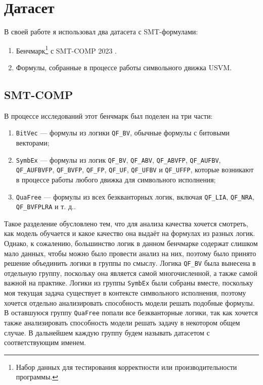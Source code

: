 
\section{Датасет}

В своей работе я использовал два датасета с SMT-формулами:

\begin{enumerate}
    \item Бенчмарк\footnote{Набор данных для тестирования корректности или производительности программы.} с SMT-COMP 2023 \cite{smt-comp-2023-benchmarks}.
    \item Формулы, собранные в процессе работы символьного движка USVM.
\end{enumerate}


\subsection{SMT-COMP}

В процессе исследований этот бенчмарк был поделен на три части:

\begin{enumerate}
    \item \texttt{BitVec} --- формулы из логики \texttt{QF\_BV}, обычные формулы с битовыми векторами;
    \item \texttt{SymbEx} --- формулы из логик \texttt{QF\_BV}, \texttt{QF\_ABV}, \texttt{QF\_ABVFP}, \texttt{QF\_AUFBV}, \\ \texttt{QF\_AUFBVFP}, \texttt{QF\_BVFP}, \texttt{QF\_FP}, \texttt{QF\_UF}, \texttt{QF\_UFBV} и \texttt{QF\_UFFP}, которые возникают в процессе работы любого движка для символьного исполнения;
    \item \texttt{QuaFree} --- формулы из всех безкванторных логик, включая \texttt{QF\_LIA}, \texttt{QF\_NRA}, \texttt{QF\_BVFPLRA} и т. д..
\end{enumerate}

Такое разделение обусловлено тем, что для анализа качества хочется смотреть, как модель обучается и какое качество она выдаёт на формулах из разных логик. Однако, к сожалению, большинство логик в данном бенчмарке содержат слишком мало данных, чтобы можно было провести анализ на них, поэтому было принято решение объединить логики в группы по смыслу. Логика \texttt{QF\_BV} была вынесена в отдельную группу, поскольку она является самой многочисленной, а также самой важной на практике. Логики из группы \texttt{SymbEx} были собраны вместе, поскольку моя текущая задача существует в контексте символьного исполнения, поэтому хочется отдельно анализировать способность модели решать подобные формулы. В оставшуюся группу \texttt{QuaFree} попали все безкванторные логики, так как хочется также анализировать способность модели решать задачу в некотором общем случае. В дальнейшем каждую группу будем называть датасетом с соответствующим именем.

